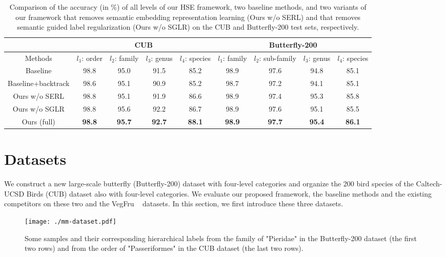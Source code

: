 \documentclass[sigconf]{acmart}
\begin{document}
\begin{table*}[htp]
\centering
\begin{tabular}{c|c|c|c|c||c|c|c|c}
\hline
& \multicolumn{4}{c||}{CUB} &\multicolumn{4}{c}{Butterfly-200} \\
\hline
\centering  Methods  & $l_1$: order & $l_2$: family  & $l_3$: genus & $l_4$: species & $l_1$: family & $l_2$: sub-family  & $l_3$: genus & $l_4$: species\\
\hline
\hline
Baseline & 98.8 & 95.0 & 91.5 & 85.2 & 98.9 & 97.6 & 94.8 & 85.1 \\
Baseline+backtrack & 98.6 & 95.1 & 90.9 & 85.2 & 98.7 & 97.2 & 94.1 & 85.1 \\
\hline
\hline 
Ours w/o SERL  & 98.8 & 95.1 & 91.9 & 86.6 & 98.9 & 97.4 & 95.3 & 85.8\\
Ours w/o SGLR  & 98.8 & 95.6 & 92.2 & 86.7 & 98.9 & 97.6 & 95.1 & 85.5 \\
Ours (full) & \textbf{98.8} & \textbf{95.7} & \textbf{92.7} & \textbf{88.1} & \textbf{98.9} & \textbf{97.7} & \textbf{95.4} & \textbf{86.1} \\
\hline
\end{tabular}
\caption{Comparison of the accuracy (in \%) of all levels of our HSE framework, two baseline methods, and two variants of our framework that removes semantic embedding representation learning (Ours w/o SERL) and that removes semantic guided label regularization (Ours w/o SGLR) on the CUB and Butterfly-200 test sets, respectively.}
\label{table:result1}
\end{table*}


\section{Datasets}
We construct a new large-scale butterfly (Butterfly-200) dataset with four-level categories and organize the 200 bird species of the Caltech-UCSD Birds (CUB) dataset also with four-level categories. We evaluate our proposed framework, the baseline methods and the existing competitors on these two and the VegFru ~\cite{hou2017vegfru} datasets. In this section, we first introduce these three datasets.


\begin{figure}[!t]
   \centering
   \texttt{[image: ./mm-dataset.pdf]} %
   \caption{Some samples and their corresponding hierarchical labels from the family of "Pieridae" in the Butterfly-200 dataset (the first two rows) and from the order of "Passeriformes" in the CUB dataset (the last two rows).}
   \label{fig:dataset}
\end{figure} 
\end{document}
